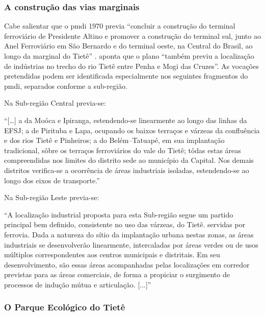 \documentclass[
article,			%
11pt,				%
oneside,			%
a4paper,			%
english,			%
brazil,				%
sumario=tradicional
]{abntex2}
\begin{document}
	\subsubsection{A construção das vias marginais} \label{s3:marginaltiete}
	
	Cabe salientar que o \gls{pmdi} 1970 previa ``concluir a construção do terminal ferroviário de Presidente Altino e promover a construção do terminal sul, junto ao Anel Ferroviário em São Bernardo e do terminal oeste, na Central do Brasil, ao longo da marginal do Tietê'' \cite[p. XVIII]{gegran1970a}.  aponta que o plano ``também previu a localização de indústrias no trecho do rio Tietê entre Penha e Mogi das Cruzes''. As vocações pretendidas podem ser identificada especialmente nos seguintes fragmentos do \gls{pmdi}, separados conforme a sub-região.
	
	Na Sub-região Central previa-se:
	
	\begin{citacao}
		``[\dots] a da Moóca e Ipiranga, estendendo-se linearmente ao longo das linhas da EFSJ; a de Pirituba e Lapa, ocupando os baixos terraços e várzeas da confluência e dos rios Tietê e Pinheiros; a do Belém--Tatuapé, em sua implantação tradicional, sôbre os terraços ferroviários do vale do Tietê; tôdas estas áreas compreendidas nos limites do distrito sede ao município da Capital. Nos demais distritos verifica-se a ocorrência de áreas industriais isoladas, estendendo-se ao longo dos eixos de transporte.'' \cite[p. 9]{gegran1970a}
	\end{citacao}
	
	Na Sub-região Leste previa-se:
	
	\begin{citacao}
		``A localização industrial proposta para esta Sub-região segue um partido principal bem definido, consistente no uso das várzeas, do Tietê. servidas por ferrovia. Dada a natureza do sítio da implantação urbana nestas zonas, as áreas industriais
		se desenvolverão linearmente, intercaladas por áreas verdes ou de usos múltiplos correspondentes aos centros municipais e distritais. Em seu desenvolvimento, são essas áreas acompanhadas pelas localizações em corredor previstas para as áreas comerciais, de forma a propiciar o surgimento de processos de indução mútua e articulação. [...]'' \cite[p. 9]{gegran1970a}
	\end{citacao}
	
	\subsubsection{O Parque Ecológico do Tietê} \label{s3:pet}
	
\end{document}
